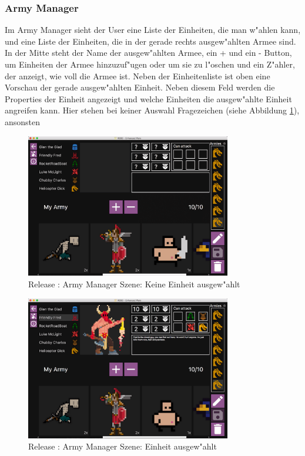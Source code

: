 \documentclass[12pt, titlepage]{scrartcl}
\newcommand{\RN}[1]{%
	\textup{\uppercase\expandafter{\romannumeral#1}}%
}
\begin{document}
		    \subsubsection{Army Manager}
		        Im Army Manager sieht der User eine Liste der Einheiten, die man w"ahlen kann, und eine Liste der Einheiten, die in der gerade rechts ausgew"ahlten Armee sind. In der Mitte steht der Name der ausgew"ahlten Armee, ein + und ein - Button, um Einheiten der Armee hinzuzuf"ugen oder um sie zu l"oschen und ein Z"ahler, der anzeigt, wie voll die Armee ist. Neben der Einheitenliste ist oben eine Vorschau der gerade ausgew"ahlten Einheit. Neben diesem Feld werden die Properties der Einheit angezeigt und welche Einheiten die ausgew"ahlte Einheit angreifen kann. Hier stehen bei keiner Auswahl Fragezeichen (siehe Abbildung \ref{Army_Manager_No_Unit_Selected}), ansonsten \\
		        \begin{figure}[H] 
    				\centering
    				\includegraphics[width=0.8\textwidth]{images/old_state/army_manager/NoUnitSelected.png}
    				\caption{Release \RN{2}: Army Manager Szene: Keine Einheit ausgew"ahlt}
    				\label{Army_Manager_No_Unit_Selected}
			    \end{figure}
			    \begin{figure}[H] 
    				\centering
    				\includegraphics[width=0.8\textwidth]{images/old_state/army_manager/UnitSelected.png}
    				\caption{Release \RN{2}: Army Manager Szene: Einheit ausgew"ahlt}
    				\label{Army_Manager_Unit_Selected}
			    \end{figure}
\end{document}
